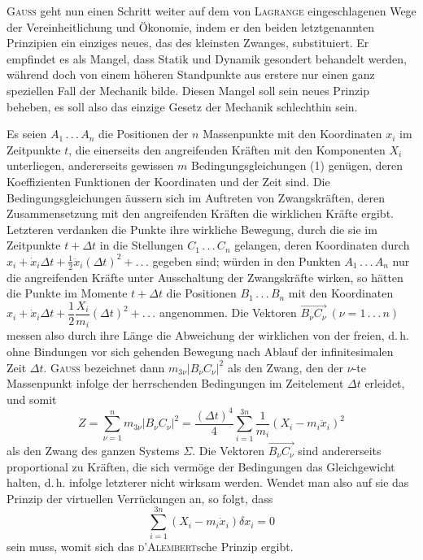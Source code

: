 \clearpage\begingroup{}
\makeatletter\tagsleft@true\let\veqno\@@leqno\makeatother
\renewcommand{\thefootnote}{\arabic{footnote})}\setcounter{footnote}{37}
\begin{center}\end{center}
\noindent\hspace*{\parindent}\textsc{Gauss} geht nun einen Schritt weiter auf dem von \textsc{Lagrange} eingeschlagenen
Wege der Vereinheitlichung und Ökonomie, indem er den beiden letztgenannten
Prinzipien ein einziges neues, das des kleinsten Zwanges, substituiert. Er
empfindet es als Mangel, dass Statik und Dynamik gesondert behandelt werden,
während doch von einem höheren Standpunkte aus erstere nur einen ganz
speziellen Fall der Mechanik bilde. Diesen Mangel soll sein neues Prinzip
beheben, es soll also das einzige Gesetz der Mechanik schlechthin sein.

Es seien $A_1\, .\, .\, .\, A_n$ die Positionen der $n$ Massenpunkte mit den Koordinaten
$x_i$ im Zeitpunkte $t$, die einerseits den angreifenden Kräften mit den
Komponenten $X_i$ unterliegen, andererseits gewissen $m$ Bedingungsgleichungen
(1) genügen, deren Koeffizienten Funktionen der Koordinaten und der Zeit
sind. Die Bedingungsgleichungen äussern sich im Auftreten von Zwangskräften,
deren Zusammensetzung mit den angreifenden Kräften die wirklichen
Kräfte ergibt. Letzteren verdanken die Punkte ihre wirkliche Bewegung,
durch die sie im Zeitpunkte $t+\Delta t$ in die Stellungen $C_1\, .\, .\, .\, C_n$ gelangen, deren
Koordinaten durch $x_i+\dot x_i\Delta t+\frac12\ddot x_i(\Delta t)^2+ .\, .\, .$ gegeben sind; würden in den
Punkten $A_1\, .\, .\, .\, A_n$ nur die angreifenden Kräfte unter Ausschaltung der Zwangskräfte
wirken, so hätten die Punkte im Momente $t+\Delta t$ die Positionen $B_1\, .\, .\, .\, B_n$
mit den Koordinaten $x_i+\dot x_i\Delta t+\dfrac12\dfrac{X_i}{m_i}(\Delta t)^2+ .\, .\, .$ angenommen. Die Vektoren
$\overrightarrow{B_\nu C_\nu}\ (\nu=1\, .\, .\, .\, n)$ messen also durch ihre Länge die Abweichung der wirklichen
von der freien, d.\,h. ohne Bindungen vor sich gehenden Bewegung
nach Ablauf der infinitesimalen Zeit $\Delta t$. \textsc{Gauss} bezeichnet dann $m_{3\nu}|B_\nu C_\nu|^2$
als den Zwang, den der $\nu$-te Massenpunkt infolge der herrschenden Bedingungen
im Zeitelement $\Delta t$ erleidet, und somit
\[
Z=\sum_{\nu=1}^{n}m_{3\nu}|B_\nu C_\nu|^2
=\frac{(\Delta t)^4}{4}\sum_{i=1}^{3n}\frac1{m_i}(X_i-m_i\ddot x_i)^2\tag{5}
\]
\clearpage{}
\noindent als den Zwang des ganzen Systems $\Sigma$. Die Vektoren $\overrightarrow{B_\nu C_\nu}$ sind andererseits
proportional zu Kräften, die sich vermöge der Bedingungen das Gleichgewicht
halten, d.\,h. infolge letzterer nicht wirksam werden. Wendet man also auf
sie das Prinzip der virtuellen Verrückungen an, so folgt, dass
\[
\sum_{i=1}^{3n}(X_i-m_i\ddot x_i)\delta x_i=0
\]
\noindent sein muss, womit sich das \textsc{d’Alembert}sche Prinzip ergibt.

